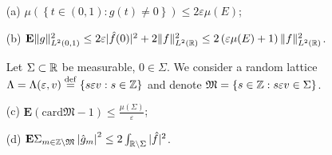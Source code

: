 \begin{proposition}
  \begin{enumerate}
    \item []
    \item [(a)] $\mu\left( \left\{ t\in (0,1):g(t)\neq 0 \right\}  \right) \le 2\varepsilon \mu(E)$;
    \item [(b)] $\mathbf{E}\|g\|^2_{L^2(0,1)}\le 2\varepsilon | \hat{f}(0) |^2+2\|f\|^2_{L^2(\mathbb{R})}\le 2\left( \varepsilon \mu(E)+1 \right) \|f\|^2_{L^2(\mathbb{R})}$. 
    \item [] Let $\Sigma \subset \mathbb{R}$ be measurable, $0\in \Sigma$. We consider a random lattice $\Lambda=\Lambda(\varepsilon ,v)\overset{\mathrm{def}}{=}\left\{ s\varepsilon v:s\in \mathbb{Z} \right\} $ and denote $\mathfrak{M}=\left\{ s\in \mathbb{Z}: s\varepsilon v\in \Sigma \right\} $.
    \item [(c)]$\mathbf{E}\left( \mathrm{card}\mathfrak{M}-1 \right)\le  \frac{\mu\left( \Sigma \right) }{\varepsilon } $;
    \item [(d)] $\mathbf{E}\Sigma_{m\in \mathbb{Z}\backslash \mathfrak{M}}\left| \hat{g}_m \right| ^2\le 2\int_{\mathbb{R}\backslash \Sigma}|\hat{f} | ^2$.
  \end{enumerate}
\end{proposition}
